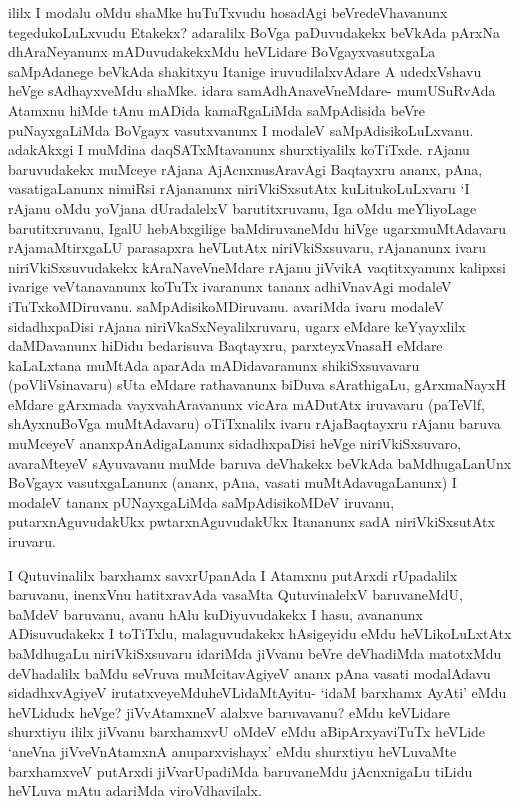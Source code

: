 \begin{artha}
ililx I modalu oMdu shaMke huTuTxvudu hosadAgi beVredeVhavanunx tegedukoLuLxvudu Etakekx? adaralilx BoVga paDuvudakekx beVkAda pArxNa dhAraNeyanunx mADuvudakekxMdu heVLidare BoVgayxvasutxgaLa saMpAdanege beVkAda shakitxyu Itanige iruvudilalxvAdare A udedxVshavu heVge sAdhayxveMdu shaMke. idara samAdhAnaveV\-neMdare- mumUSuRvAda Atamxnu hiMde tAnu mADida kamaRgaLiMda saMpAdisida beVre puNayxgaLiMda BoVgayx vasutxvanunx I modaleV saMpAdisikoLuLxvanu. adakAkxgi I muMdina daqSATxMtavanunx shurxtiyalilx koTiTxde. rAjanu baruvudakekx muMceye rAjana AjAcnxnusAravAgi Baqtayxru ananx, pAna, vasatigaLanunx nimiRsi rAjananunx niriVkiSxsutAtx kuLitukoLuLxvaru `I rAjanu oMdu yoVjana dUradalelxV barutitxruvanu, Iga oMdu meYliyoLage barutitxruvanu, IgalU hebAbxgilige baMdiruvaneMdu hiVge ugarxmuMtAdavaru rAjamaMtirxgaLU parasapxra heVLutAtx niriVkiSxsuvaru, rAjananunx ivaru niriVkiSxsuvudakekx kAraNaveVneMdare rAjanu jiVvikA vaqtitxyanunx kalipxsi ivarige veVtanavanunx koTuTx ivaranunx tananx adhiVnavAgi modaleV iTuTxkoMDiruvanu. saMpAdisikoMDiruvanu. avariMda ivaru modaleV sidadhxpaDisi rAjana niriVkaSxNeyalilxruvaru, ugarx eMdare keYyayxlilx daMDavanunx hiDidu bedarisuva Baqtayxru, parxteyxVnasaH eMdare kaLaLxtana muMtAda aparAda mADidavaranunx shikiSxsuvavaru (poVliVsinavaru) sUta eMdare rathavanunx biDuva sArathigaLu, gArxmaNayxH eMdare gArxmada vayxvahAravanunx vicAra mADutAtx iruvavaru (paTeVlf, shAyxnuBoVga muMtAdavaru) oTiTxnalilx ivaru rAjaBaqtayxru rAjanu baruva muMceyeV ananxpAnAdigaLanunx sidadhxpaDisi heVge niriVkiSxsuvaro, avaraMteyeV sAyuvavanu muMde baruva deVhakekx beVkAda baMdhugaLanUnx BoVgayx vasutxgaLanunx (ananx, pAna, vasati muMtAdavugaLanunx) I modaleV tananx pUNayxgaLiMda saMpAdisikoMDeV iruvanu, putarxnAguvudakUkx pwtarxnAguvudakUkx Itananunx sadA niriVkiSxsutAtx iruvaru. 
\end{artha}%

\begin{artha}
I Qutuvinalilx barxhamx savxrUpanAda I Atamxnu putArxdi rUpadalilx baruvanu, inenxVnu hatitxravAda vasaMta QutuvinalelxV baruvaneMdU, baMdeV baruvanu, avanu hAlu kuDiyuvudakekx I hasu, avananunx ADisuvudakekx I toTiTxlu, malaguvudakekx hAsigeyidu eMdu heVLikoLuLxtAtx baMdhugaLu niriVkiSxsuvaru idariMda jiVvanu beVre deVhadiMda matotxMdu deVhadalilx baMdu seVruva muMcitavAgiyeV ananx pAna vasati modalAdavu sidadhxvAgiyeV irutatxveyeMdu\break heVLidaMtAyitu- `idaM barxhamx AyAti' eMdu heVLidudx heVge? jiVvAtamxneV alalxve baruvavanu? eMdu keVLidare shurxtiyu ililx jiVvanu barxhamxvU oMdeV eMdu aBipArxyaviTuTx heVLide `aneVna jiVveVnAtamxnA anuparxvishayx' eMdu shurxtiyu heVLuvaMte barxhamxveV putArxdi jiVvarUpadiMda baruvaneMdu jAcnxnigaLu tiLidu heVLuva mAtu adariMda viroVdhavilalx. 	
\end{artha}%

